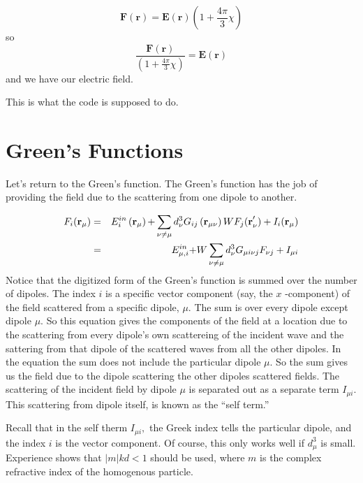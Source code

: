 \documentclass{article}
\begin{document}
\begin{equation*}
\mathbf{F}(\mathbf{r})=\mathbf{E}(\mathbf{r})(1+\frac{4\pi }{3}\chi )
\end{equation*}%
so 
\begin{equation*}
\frac{\mathbf{F}(\mathbf{r})}{(1+\frac{4\pi }{3}\chi )}=\mathbf{E}(\mathbf{r}%
)
\end{equation*}%
and we have our electric field.

This is what the code is supposed to do.

\section{Green's Functions}

Let's return to the Green's function. The Green's function has the job of
providing the field due to the scattering from one dipole to another.

\begin{eqnarray}
F_{i}(\mathbf{r}_{\mu }) &=&E_{i}^{in}\left( \mathbf{r}_{\mu }\right) 
\mathbf{+}\sum\limits_{\nu \neq \mu }d_{\nu }^{3}G_{ij}\left( \mathbf{r}%
_{\mu \nu }\right) WF_{j}\mathbf{(r}_{\nu }^{\prime })+I_{i}(\mathbf{r}_{\mu
})  \label{F1} \\
&=&E_{\mu ,i}^{in}\mathbf{+}W\sum\limits_{\nu \neq \mu }d_{\nu }^{3}G_{\mu
i\nu j}F_{\nu j}+I_{\mu i}  \notag
\end{eqnarray}%
Notice that the digitized form of the Green's function is summed over the
number of dipoles. The index $i$ is a specific vector component (say, the $x$%
-component) of the field scattered from a specific dipole, $\mu $. The sum
is over every dipole except dipole $\mu $. So this equation gives the
components of the field at a location due to the scattering from every
dipole's own scattereing of the incident wave and the sattering from that
dipole of the scattered waves from all the other dipoles. In the equation
the sum does not include the particular dipole $\mu .$ So the sum gives us
the field due to the dipole scattering the other dipoles scattered fields.
The scattering of the incident field by dipole $\mu $ is separated out as a
separate term $I_{\mu i}.$ This scattering from dipole itself, is known as
the \textquotedblleft self term.\textquotedblright\ 

Recall that in the self therm $I_{\mu i},$ the Greek index tells the
particular dipole, and the index $i$ is the vector component. Of course,
this only works well if $d_{\mu }^{3}$ is small. Experience shows that $%
\left\vert m\right\vert kd<1$ should be used, where $m$ is the complex
refractive index of the homogenous particle.
\end{document}

